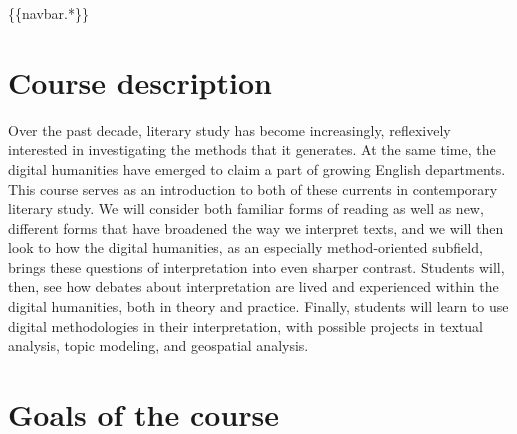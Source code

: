 
\def\mytitle{Introduction to the Study of Literature}
\def\instructor{Moacir P. de Sá Pereira}
\def\instructorurl{http:/\slash moacir.com}
\def\instructoremail{blah@blah.com}
\def\courseurl{http:/\slash moacir.com\slash courses-nyu\slash english-101-2017}
\def\coursecode{ENGL-UA 101.001}
\def\courseterm{Spring 2017}
\def\courseroom{ARC LL03}
\def\coursetime{MW 15:30–16:45}
\def\officehours{244 Greene, 506, T 15:00–16:30}
\def\githuburl{http:/\slash github.com\slash muziejus\slash english-101-2017}
\def\transcludebase{sections}


\{\{navbar.*\}\}

\chapter{Course description}
\label{coursedescription}

Over the past decade, literary study has become increasingly, reflexively
interested in investigating the methods that it generates. At the same time,
the digital humanities have emerged to claim a part of growing English
departments. This course serves as an introduction to both of these currents in
contemporary literary study. We will consider both familiar forms of reading as
well as new, different forms that have broadened the way we interpret texts,
and we will then look to how the digital humanities, as an especially
method-oriented subfield, brings these questions of interpretation into even
sharper contrast. Students will, then, see how debates about interpretation are
lived and experienced within the digital humanities, both in theory and
practice. Finally, students will learn to use digital methodologies in their
interpretation, with possible projects in textual analysis, topic modeling, and
geospatial analysis.

\chapter{Goals of the course}
\label{goalsofthecourse}

